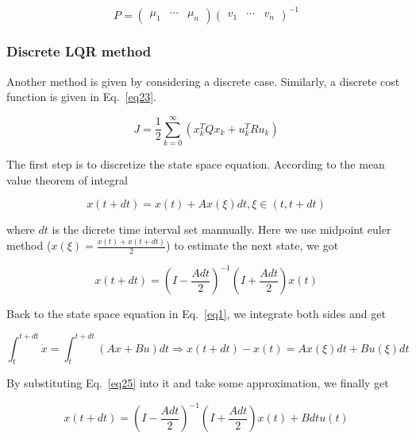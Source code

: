 \documentclass[hyperref]{article}
\theoremstyle{nonumberplain}
\begin{document}
	\begin{equation}
	P=\begin{pmatrix}
	\mu _{1} &\cdots   & \mu _{n}
	\end{pmatrix}
	\begin{pmatrix}
	v_{1} &\cdots   & v_{n}
	\end{pmatrix}^{-1}
	\label{eq22}
	\end{equation}
	
	\subsubsection{Discrete LQR method}
	
	\hspace{1.0em}
	Another method is given by considering a discrete case. Similarly, a discrete cost function is given in Eq.~\ref{eq23}.
	
	\begin{equation}
	J=\frac{1}{2}\sum_{k=0}^{\infty}(x_{k}^{T}Qx_{k}+u_{k}^{T}Ru_{k})
	\label{eq23}
	\end{equation}
	
	The first step is to discretize the state space equation. According to the mean value theorem of integral
	
	\begin{equation}
	x(t+dt)=x(t)+Ax(\xi )dt, \xi \in (t,t+dt)
	\label{eq24}
	\end{equation}
	
	where $dt$ is the dicrete time interval set mannually. Here we use midpoint euler method ($x(\xi)=\frac{x(t)+x(t+dt)}{2}$) to estimate the next state, we got
	
	\begin{equation}
	x(t+dt)=(I-\frac{Adt}{2})^{-1}(I+\frac{Adt}{2})x(t)
	\label{eq25}
	\end{equation}
	
	Back to the state space equation in Eq.~\ref{eq1}, we integrate both sides and get
	
	\begin{equation}
	\int_{t}^{t+dt}\dot{x}=\int_{t}^{t+dt}(Ax+Bu)dt\Rightarrow x(t+dt)-x(t)=Ax(\xi )dt+Bu(\xi)dt
	\label{eq26}
	\end{equation}
	
	By substituting Eq.~\ref{eq25} into it and take some approximation, we finally get
	
	\begin{equation}
	x(t+dt)=(I-\frac{Adt}{2})^{-1}(I+\frac{Adt}{2})x(t)+Bdtu(t)
	\label{eq27}
	\end{equation}
	
\end{document}
